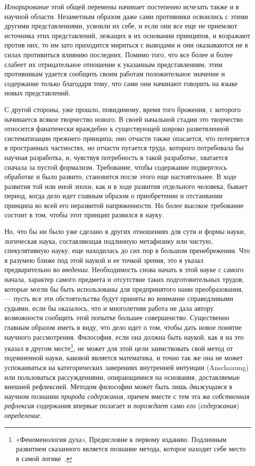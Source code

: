 {\em Игнорирование} этой общей перемены начинает
постепенно исчезать также и в научной области. Незаметным образом даже сами
противники освоились с этими другими представлениями, усвоили их себе, и
если они все еще не приемлют источника этих представлений, лежащих в их
основании принципов, и возражают против них, то им зато приходится мириться
с выводами и они оказываются не в силах противиться влиянию последних.
Помимо того, что все более и более слабеет их отрицательное отношение к
указанным представлениям, этим противникам удается сообщить своим работам
положительное значение и содержание только благодаря тому, что сами они
начинают говорить на языке новых представлений.

С другой стороны, уже прошло, повидимому, время того брожения, с которого
начинается всякое творчество нового. В своей начальной стадии это
творчество относится фанатически враждебно к существующей широко
разветвленной систематизации прежнего принципа; оно отчасти также
опасается, что потеряется в пространных частностях, но отчасти пугается
труда, которого потребовала бы научная разработка, и, чувствуя потребность
в такой разработке, хватается сначала за пустой формализм. Требование,
чтобы содержание подверглось обработке и было развито, становится после
этого еще настоятельнее. В ходе развития той или иной эпохи, как и в ходе
развития отдельного человека, бывает период, когда дело идет главным
образом о приобретении и отстаивании принципа во всей его неразвитой
напряженности. Но более высокое требование состоит в том, чтобы этот
принцип развился в науку.

Но, что бы ни было уже сделано в других отношениях для сути и формы науки,
логическая наука, составляющая подлинную метафизику или чистую,
спекулятивную науку, еще находилась до сих пор в большом пренебрежении. Что
я разумею ближе под этой наукой и ее точкой зрения, это я указал
предварительно во {\em введении}. Необходимость снова
начать в этой науке с самого начала, характер самого предмета и отсутствие
таких подготовительных трудов, которые могли бы быть использованы для
предпринятого нами преобразования, — пусть все эти обстоятельства будут
приняты во внимание справедливыми судьями, если бы оказалось, что и
многолетняя работа не дала автору возможности сообщить этой попытке большее
совершенство. Существенно главным образом иметь в виду, что дело идет о
том, чтобы дать новое понятие научного рассмотрения. Философия, если она
должна быть наукой, как я на это указал в другом
месте\footnote{«Феноменология духа», Предисловие к первому изданию.
Подлинным развитием сказанного является познание метода, которое находит
себе место в самой
логике~.},
не может для этой цели заимствовать свой метод от подчиненной науки,
каковой является математика, и точно так же она не может успокаиваться на
категорических заверениях внутренней интуиции (Anschauung) или пользоваться
рассуждениями, опирающимися на основания, доставляемые внешней рефлексией.
Методом философии может быть лишь {\em движущаяся} в
научном познании {\em природа содержания}, причем
вместе с тем эта же {\em собственная рефлексия}
содержания впервые полагает и {\em порождает} само
{\em его} ({\em содержания})
{\em определение}.

